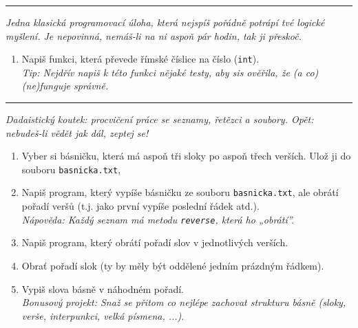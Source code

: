 \documentclass[a4paper,10pt]{article}
\newcommand\startsection[1]{
     \vspace{0.2ex}
    \hrule
    {\fontspec{Oxygen} \tiny
     \vspace{-1ex}
     \emph{#1}
     \vspace{-1.5em}
    }
}
\begin{document}

\startsection{Jedna klasická programovací úloha, která nejspíš pořádně potrápí
    tvé logické myšlení. Je nepovinná, nemáš-li na ni aspoň pár hodin,
    tak ji přeskoč.}

\begin{enumerate}[resume]

\item Napiš funkci, která převede římské číslice na číslo (\verb+int+).
    \\\emph{Tip: Nejdřív napiš k této funkci nějaké testy, aby sis
        ověřila, že (a co) (ne)funguje správně.}

\end{enumerate}

\startsection{Dadaistický koutek: procvičení práce se seznamy, řetězci
    a soubory. Opět: nebudeš-li vědět jak dál, zeptej se!}

\begin{enumerate}[resume]

\item Vyber si básničku, která má aspoň tři sloky po aspoň třech verších.
    Ulož ji do souboru \verb+basnicka.txt+,

\item Napiš program, který vypíše básničku ze souboru \verb+basnicka.txt+,
    ale obrátí pořadí veršů (t.j. jako první vypíše poslední řádek atd.).
    \\\emph{Nápověda: Každý seznam má metodu \texttt{reverse}, která ho „obrátí”.}

\item Napiš program, který obrátí pořadí slov v jednotlivých verších.

\item Obrať pořadí slok (ty by měly být oddělené jedním prázdným řádkem).

\item Vypiš slova básně v náhodném pořadí.
    \\\emph{Bonusový projekt: Snaž se přitom co nejlépe zachovat strukturu básně
        (sloky, verše, interpunkci, velká písmena, ...)}.

\end{enumerate}
\end{document}
